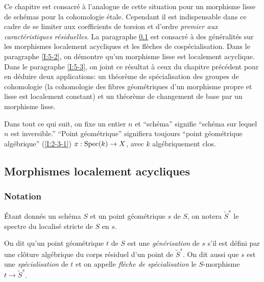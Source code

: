 Ce chapitre est consacré à l'analogue de cette situation pour un morphisme 
lisse de schémas pour la cohomologie étale. Cependant il est indispensable 
dans ce cadre de se limiter aux coefficients de torsion et d'ordre \emph{premier aux caractéristiques résiduelles}. La paragraphe \ref{I:5-1} est consacré 
à des généralités sur les morphismes localement acycliques et les 
flèches de cospécialisation. Dans le paragraphe \ref{I:5-2}, on démontre 
qu'un morphisme lisse est localement acyclique. Dans le paragraphe \ref{I:5-3}, on 
joint ce résultat à ceux du chapitre précédent pour en déduire deux 
applications: un théorème de spécialisation des groupes de cohomologie (la 
cohomologie des fibres géométriques d'un morphisme propre et lisse est 
localement constant) et un théorème de changement de base par un morphisme 
lisse. 

Dans tout ce qui suit, on fixe un entier $n$ et ``schéma'' signifie ``schéma 
sur lequel $n$ est inversible.'' ``Point géométrique'' signifiera toujours 
``point géométrique algébrique'' (\ref{I:2-3-1}) $x:\operatorname{Spec}(k)\to X$, avec $k$ 
algébriquement clos. 










\subsection{Morphismes localement acycliques}\label{I:5-1}





\subsubsection{Notation}\label{I:5-1-1}

Étant donnés un schéma $S$ et un point géométrique $s$ de $S$, on 
notera $\widetilde S^s$ le spectre du localisé stricte de $S$ en $s$. 





\begin{definition}\label{I:5-1-2}
On dit qu'un point géométrique $t$ de $S$ est une \emph{générisation} de 
$s$ s'il est défini par une clôture algébrique du corps résiduel d'un 
point de $\widetilde S^s$. On dit aussi que $s$ est une \emph{spécialisation} 
de $t$ et on appelle \emph{flèche de spécialisation} le $S$-morphisme 
$t\to \widetilde S^s$. 
\end{definition}





